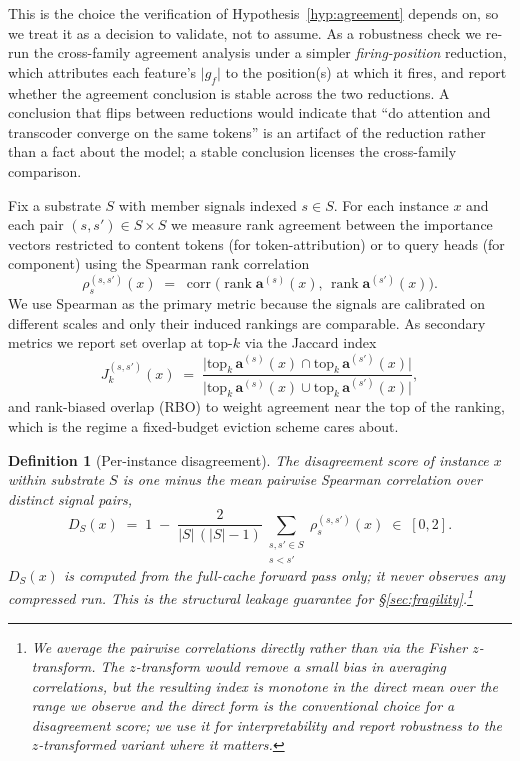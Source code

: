\documentclass[11pt]{article}
\newtheorem{definition}{Definition}
\newcommand{\Spearman}{\rho_{s}}
\begin{document}
This is the choice the verification of Hypothesis~\ref{hyp:agreement}
depends on, so we treat it as a decision to validate, not to assume. As a
robustness check we re-run the cross-family agreement analysis under a
simpler \emph{firing-position} reduction, which attributes each feature's
$\lvert g_f \rvert$ to the position(s) at which it fires, and report whether
the agreement conclusion is stable across the two reductions. A conclusion
that flips between reductions would indicate that ``do attention and
transcoder converge on the same tokens'' is an artifact of the reduction
rather than a fact about the model; a stable conclusion licenses the
cross-family comparison.

Fix a substrate $S$ with member signals indexed $s \in S$. For each instance
$x$ and each pair $(s,s') \in S \times S$ we measure rank agreement between
the importance vectors restricted to content tokens (for token-attribution)
or to query heads (for component) using the Spearman rank correlation
\[
  \Spearman^{(s,s')}(x)
  \;=\;
  \operatorname{corr}\!\bigl(
    \operatorname{rank} \mathbf{a}^{(s)}(x),\,
    \operatorname{rank} \mathbf{a}^{(s')}(x)
  \bigr).
\]
We use Spearman as the primary metric because the signals are calibrated on
different scales and only their induced rankings are comparable. As
secondary metrics we report set overlap at top-$k$ via the Jaccard index
\[
  J_k^{(s,s')}(x)
  \;=\;
  \frac{\bigl| \mathrm{top}_k\,\mathbf{a}^{(s)}(x) \cap
               \mathrm{top}_k\,\mathbf{a}^{(s')}(x) \bigr|}
       {\bigl| \mathrm{top}_k\,\mathbf{a}^{(s)}(x) \cup
               \mathrm{top}_k\,\mathbf{a}^{(s')}(x) \bigr|},
\]
and rank-biased overlap (RBO) to weight agreement near the top of the
ranking, which is the regime a fixed-budget eviction scheme cares about.

\begin{definition}[Per-instance disagreement]
\label{def:disagreement}
The disagreement score of instance $x$ within substrate $S$ is one minus the
mean pairwise Spearman correlation over distinct signal pairs,
\[
  D_S(x)
  \;=\;
  1 \;-\;
  \frac{2}{|S|\,(|S|-1)}
  \sum_{\substack{s,s' \in S \\ s < s'}}
  \Spearman^{(s,s')}(x)
  \;\in\; [0,2].
\]
$D_S(x)$ is computed from the \emph{full-cache forward pass only}; it never
observes any compressed run. This is the structural leakage guarantee for
\S\ref{sec:fragility}.\footnote{We average the pairwise correlations
directly rather than via the Fisher $z$-transform. The $z$-transform would
remove a small bias in averaging correlations, but the resulting index is
monotone in the direct mean over the range we observe and the direct form is
the conventional choice for a disagreement score; we use it for
interpretability and report robustness to the $z$-transformed variant where
it matters.}
\end{definition}
\end{document}
